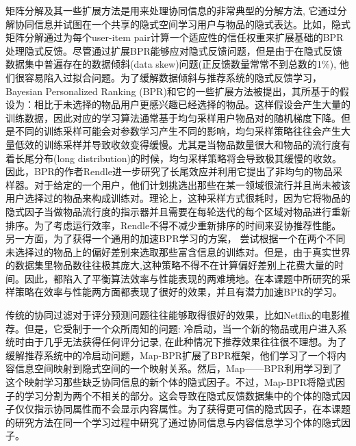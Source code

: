 矩阵分解\cite{girase2015role}及其一些扩展方法\cite{li2010improving,gemulla2011large,zhang2014temporal}是用来处理协同信息的非常典型的分解方法, 它通过分解协同信息并试图在一个共享的隐式空间学习用户与物品的隐式表达。比如，隐式矩阵分解\cite{hu2008collaborative}通过为每个user-item pair计算一个适应性的信任权重来扩展基础的BPR处理隐式反馈。尽管通过扩展BPR能够应对隐式反馈问题，但是由于在隐式反馈数据集中普遍存在的数据倾斜(data skew)问题(正反馈数量常常不到总数的1\%), 他们很容易陷入过拟合问题。为了缓解数据倾斜与推荐系统的隐式反馈学习，Bayesian Personalized Ranking (BPR)\cite{rendle2009bpr}和它的一些扩展方法\cite{pan2013gbpr,qiu2014item,rendle2014improving}被提出，其所基于的假设为：相比于未选择的物品用户更感兴趣已经选择的物品。这样假设会产生大量的训练数据，因此对应的学习算法通常基于均匀采样用户物品对的随机梯度下降。但是不同的训练采样可能会对参数学习产生不同的影响，均匀采样策略往往会产生大量低效的训练采样并导致收敛变得缓慢。尤其是当物品数量很大和物品的流行度有着长尾分布(long distribution)\cite{feldmann1997fitting}的时候，均匀采样策略将会导致极其缓慢的收敛。因此，BPR的作者Rendle进一步研究了长尾效应并利用它提出了非均匀的物品采样器\cite{rendle2014improving}。对于给定的一个用户，他们计划挑选出那些在某一领域很流行并且尚未被该用户选择过的物品来构成训练对。理论上，这种采样方式很耗时，因为它将物品的隐式因子当做物品流行度的指示器并且需要在每轮迭代的每个区域对物品进行重新排序。为了考虑运行效率，Rendle不得不减少重新排序的时间来妥协推荐性能。另一方面，为了获得一个通用的加速BPR学习的方案，\cite{zhong2014adaptive} 尝试根据一个在两个不同未选择过的物品上的偏好差别来选取那些富含信息的训练对。但是，由于真实世界的数据集里物品数往往极其庞大,这种策略不得不在计算偏好差别上花费大量的时间。因此，\cite{rendle2014improving,zhong2014adaptive}都陷入了平衡算法效率与性能表现的两难境地。在本课题中所研究的采样策略在效率与性能两方面都表现了很好的效果，并且有潜力加速BPR的学习。

传统的协同过滤对于评分预测问题往往能够取得很好的效果，比如Netflix的电影推荐。但是，它受制于一个众所周知的问题: 冷启动，当一个新的物品或用户进入系统时由于几乎无法获得任何评分记录, 在此种情况下推荐效果往往很不理想。为了缓解推荐系统中的冷启动问题，Map-BPR\cite{gantner2010learning}扩展了BPR框架，他们学习了一个将内容信息空间映射到隐式空间的一个映射关系。然后，Map——BPR利用学习到了这个映射学习那些缺乏协同信息的新个体的隐式因子。不过，Map-BPR将隐式因子的学习分割为两个不相关的部分。这会导致在隐式反馈数据集中的个体的隐式因子仅仅指示协同属性而不会显示内容属性。为了获得更可信的隐式因子，在本课题的研究方法在同一个学习过程中研究了通过协同信息与内容信息学习个体的隐式因子。

